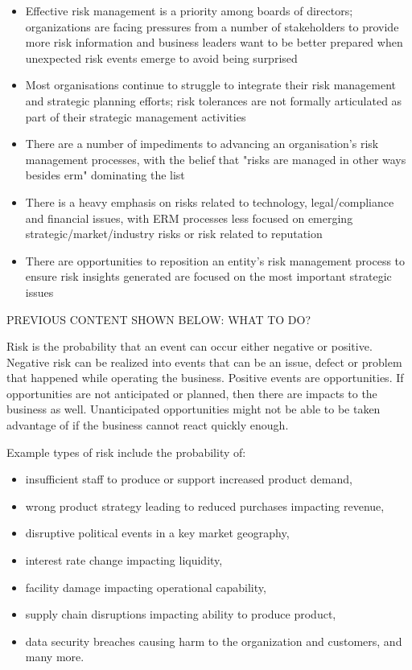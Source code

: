 \begin{itemize}
    \item Effective risk management is a priority among boards of directors;
            organizations are facing pressures from a number of stakeholders to provide more risk information and
            business leaders want to be better prepared when unexpected risk events emerge to avoid being surprised
    \item Most organisations continue to struggle to integrate their risk management and strategic planning efforts;
            risk tolerances are not formally articulated as part of their strategic management activities
    \item There are a number of impediments to advancing an organisation’s risk management processes,
            with the belief that "risks are managed in other ways besides \gls{erm}" dominating the list
    \item There is a heavy emphasis on risks related to technology, legal/compliance and financial issues,
            with ERM processes less focused on emerging strategic/market/industry risks or risk related to reputation
    \item There are opportunities to reposition an entity's risk management process to ensure risk insights
            generated are focused on the most important strategic issues
\end{itemize}



PREVIOUS CONTENT SHOWN BELOW: WHAT TO DO?

Risk is the probability that an event can occur either negative or positive.
Negative risk can be realized into events that can be an issue,
defect or problem that happened while operating the business.
Positive events are opportunities.
If opportunities are not anticipated or planned, then there are impacts to the business as well.
Unanticipated opportunities might not be able to be taken advantage of if the business cannot react quickly enough.

Example types of risk include the probability of:
\begin{itemize}
    \item insufficient staff to produce or support increased product demand,
    \item wrong product strategy leading to reduced purchases impacting revenue,
    \item disruptive political events in a key market geography,
    \item interest rate change impacting liquidity,
    \item facility damage impacting operational capability,
    \item supply chain disruptions impacting ability to produce product,
    \item data security breaches causing harm to the organization and customers, and many more.
\end{itemize}

